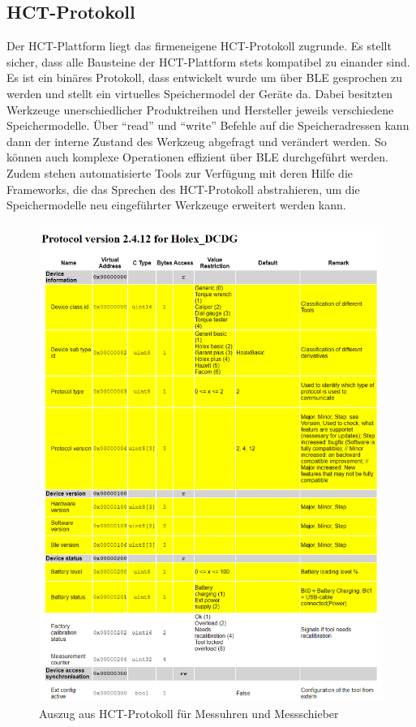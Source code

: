 \subsection{HCT-Protokoll}
Der HCT-Plattform liegt das firmeneigene HCT-Protokoll zugrunde. Es stellt sicher, dass alle Bausteine der HCT-Plattform stets kompatibel zu einander sind. Es ist ein binäres Protokoll, dass entwickelt wurde um über BLE gesprochen zu werden und stellt ein virtuelles Speichermodel der Geräte da. Dabei besitzten Werkzeuge unerschiedlicher Produktreihen und Hersteller jeweils verschiedene Speichermodelle. Über ``read'' und ``write'' Befehle auf die Speicheradressen kann dann der interne Zustand des Werkzeug abgefragt und verändert werden. So können auch komplexe Operationen effizient über BLE durchgeführt werden. Zudem stehen automatisierte Tools zur Verfügung mit deren Hilfe die Frameworks, die das Sprechen des HCT-Protokoll abstrahieren, um die Speichermodelle neu eingeführter Werkzeuge erweitert werden kann.
\begin{figure}[H] 
	\centering
	\includegraphics[width=\textwidth]{figures/HCT_Protocol_DCDG.png}
	\caption{Auszug aus HCT-Protokoll für Messuhren und Messschieber}
\end{figure}

